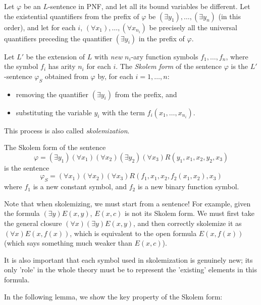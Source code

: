 \begin{definition}
Let $\varphi$ be an $L$-sentence in PNF, and let all its bound variables be different. Let the existential quantifiers from the prefix of $\varphi$ be $(\exists y_1),\dots,(\exists y_n)$ (in this order), and let for each $i$, $(\forall x_1),\dots,(\forall x_{n_i})$ be precisely all the universal quantifiers preceding the quantifier $(\exists y_i)$ in the prefix of $\varphi$. 

Let $L'$ be the extension of $L$ with \emph{new} $n_i$-ary function symbols $f_1,\dots,f_n$, where the symbol $f_i$ has arity $n_i$ for each $i$. The \emph{Skolem form} of the sentence $\varphi$ is the $L'$-sentence $\varphi_S$ obtained from $\varphi$ by, for each $i=1,\dots,n$:
\begin{itemize}
    \item removing the quantifier $(\exists y_i)$ from the prefix, and
    \item substituting the variable $y_i$ with the term $f_i(x_1,\dots,x_{n_i})$.
\end{itemize}
This process is also called \emph{skolemization}.
\end{definition}

\begin{example}
    The Skolem form of the sentence 
    $$\varphi=(\exists y_1)(\forall x_1)(\forall x_2)(\exists y_2)(\forall x_3)R(y_1,x_1,x_2,y_2,x_3)$$
    is the sentence
    $$
    \varphi_S=(\forall x_1)(\forall x_2)(\forall x_3)R(f_1,x_1,x_2,f_2(x_1,x_2),x_3)
    $$
    where $f_1$ is a new constant symbol, and $f_2$ is a new binary function symbol.
\end{example}

\begin{remark}
    Note that when skolemizing, we must start from a sentence! For example, given the formula $(\exists y)E(x,y)$, $E(x,c)$ is not its Skolem form. We must first take the general closure $(\forall x)(\exists y)E(x,y)$, and then correctly skolemize it as $(\forall x)E(x,f(x))$, which is equivalent to the open formula $E(x,f(x))$ (which says something much weaker than $E(x,c)$).

    It is also important that each symbol used in skolemization is genuinely new; its only 'role' in the whole theory must be to represent the 'existing' elements in this formula.
\end{remark} 

In the following lemma, we show the key property of the Skolem form:

